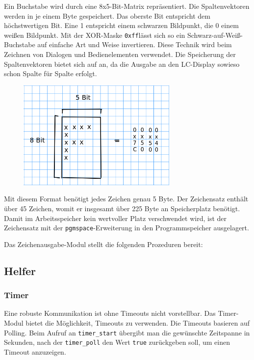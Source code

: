 \documentclass[ngerman]{article}
\begin{document}
Ein Buchstabe wird durch eine 8x5-Bit-Matrix repräsentiert. Die
Spaltenvektoren werden in je einem Byte gespeichert. Das oberste Bit
entspricht dem höchstwertigen Bit. Eine 1 entspricht einem schwarzen
Bildpunkt, die 0 einem weißen Bildpunkt. Mit der XOR-Maske {\tt 0xff}lässt
sich so ein Schwarz-auf-Weiß-Buchstabe auf einfache Art und Weise
invertieren. Diese Technik wird beim Zeichnen von Dialogen und Bedienelementen 
verwendet. Die Speicherung der Spaltenvektoren bietet sich auf an,
da die Ausgabe an den LC-Display sowieso schon Spalte für Spalte erfolgt.

\begin{figure}[h!] \begin{center}
    \includegraphics[width=0.7\textwidth]{media/char}
\end{center} \end{figure}

Mit diesem Format benötigt jedes Zeichen genau 5 Byte. Der Zeichensatz
enthält über 45 Zeichen, womit er insgesamt über 225 Byte an
Speicherplatz benötigt. Damit im Arbeitsspeicher kein wertvoller Platz  
verschwendet wird, ist der Zeichensatz mit der
{\tt pgmspace}-Erweiterung in den Programmspeicher ausgelagert.

Das Zeichenausgabe-Modul stellt die folgenden Prozeduren bereit:



\subsection{Helfer}


\subsubsection{Timer}

Eine robuste Kommunikation ist ohne Timeouts nicht vorstellbar.
Das Timer-Modul bietet die Möglichkeit, Timeouts zu verwenden.
Die Timeouts basieren auf Polling. Beim Aufruf
an {\tt timer\_start} übergibt man die gewünschte Zeitspanne in
Sekunden, nach der {\tt timer\_poll} den Wert {\tt true}
zurückgeben soll, um einen Timeout anzuzeigen. 
\end{document}
